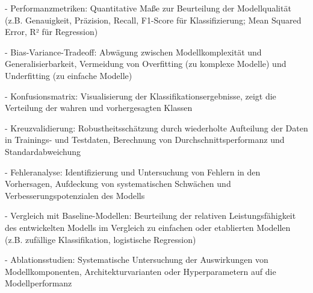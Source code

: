 - Performanzmetriken: Quantitative Maße zur Beurteilung der Modellqualität (z.B. Genauigkeit, Präzision, Recall, F1-Score für Klassifizierung; Mean Squared Error, R² für Regression)

- Bias-Variance-Tradeoff: Abwägung zwischen Modellkomplexität und Generalisierbarkeit, Vermeidung von Overfitting (zu komplexe Modelle) und Underfitting (zu einfache Modelle)

- Konfusionsmatrix: Visualisierung der Klassifikationsergebnisse, zeigt die Verteilung der wahren und vorhergesagten Klassen

- Kreuzvalidierung: Robustheitsschätzung durch wiederholte Aufteilung der Daten in Trainings- und Testdaten, Berechnung von Durchschnittsperformanz und Standardabweichung

- Fehleranalyse: Identifizierung und Untersuchung von Fehlern in den Vorhersagen, Aufdeckung von systematischen Schwächen und Verbesserungspotenzialen des Modells

- Vergleich mit Baseline-Modellen: Beurteilung der relativen Leistungsfähigkeit des entwickelten Modells im Vergleich zu einfachen oder etablierten Modellen (z.B. zufällige Klassifikation, logistische Regression)

- Ablationsstudien: Systematische Untersuchung der Auswirkungen von Modellkomponenten, Architekturvarianten oder Hyperparametern auf die Modellperformanz